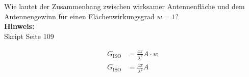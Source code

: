 \begin{question}[section=11,name={Antennenfläche \& Antennengewinn},difficulty=,quantity=8,type=thr,tags={}]
	Wie lautet der Zusammenhang zwischen wirksamer Antennenfläche und dem Antennengewinn für einen Flächenwirkungsgrad $w = 1$?
	\\ \textbf{Hinweis:}\\
	Skript Seite 109
\end{question}
\begin{solution}
	\begin{align}
	G_\mathrm{ISO} &= \frac{4\pi}{\lambda^2} A \cdot w \\
	G_\mathrm{ISO} &= \frac{4\pi}{\lambda^2} A
\end{align}
\end{solution}